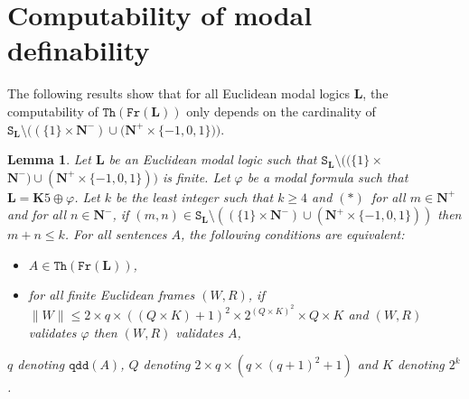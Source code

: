 \documentclass[draft]{article}
\newtheorem{lemma}{Lemma}
\def\qdd{\mathtt{qdd}}
\def\Th{\mathtt{Th}}
\def\Fr{\mathtt{Fr}}
\def\L{\mathbf{L}}
\def\K{\mathbf{K}}
\begin{document}
\section{Computability of modal definability}\label{section:about:computability:of:modal:definability}
%
%
The following results show that for all Euclidean modal logics $\L$, the computability of $\Th(\Fr(\L))$ only depends on the cardinality of $\mathtt{S}_{\L}{\setminus}((\{1\}{\times}\mathbf{N}^{-}){\cup}(\mathbf{N}^{+}{\times}\{{-}1,
%
%
%
%
%
%
%
%
%
%
%
%
$\linebreak$
%
%
%
%
%
%
%
%
%
%
%
%
0,1\}))$.
%
%
\begin{lemma}\label{decidability:if:setminus:is:finite}
%
%
%
%
%
%
%
%
%
%
%
%
%
%
%
%
%
%
%
%
%
%
%
%
%
%
Let $\L$ be an Euclidean modal logic such that $\mathtt{S}_{\L}{\setminus}((\{1\}{\times}
%
%
%
%
%
%
%
%
%
%
%
%
$\linebreak$
%
%
%
%
%
%
%
%
%
%
%
%
\mathbf{N}^{-}){\cup}(\mathbf{N}^{+}{\times}\{{-}1,0,1\}))$ is finite.
Let $\varphi$ be a modal formula such that $\L{=}\K5{\oplus}\varphi$.
Let $k$ be the least integer such that $k{\geq}4$ and $(\ast)$~for all $m{\in}\mathbf{N}^{+}$ and for all $n{\in}\mathbf{N}^{-}$, if $(m,n){\in}\mathtt{S}_{\L}{\setminus}((\{1\}{\times}\mathbf{N}^{-}){\cup}(\mathbf{N}^{+}{\times}\{{-}1,0,1\}))$ then $m{+}n{\leq}k$.
For all sentences $A$, the following conditions are equivalent:
%
%
\begin{itemize}
%
%
\item $A{\in}\Th(\Fr(\L))$,
%
%
\item for all finite Euclidean frames $(W,R)$, if ${\parallel}W{\parallel}{\leq}2{\times}q{\times}((Q{\times}K){+}1)^{2}{\times}
%
%
%
%
%
%
%
%
%
%
%
%
$\linebreak$
%
%
%
%
%
%
%
%
%
%
%
%
2^{(Q{\times}K)^{2}}{\times}Q{\times}K$ and $(W,R)$ validates $\varphi$ then $(W,R)$ validates $A$,
%
%
\end{itemize}
%
%
$q$ denoting $\qdd(A)$, $Q$ denoting $2{\times}q{\times}(q{\times}(q{+}1)^{2}+1)$ and $K$ denoting $2^{k}$.
%
%
\end{lemma}
%
%
\end{document}
